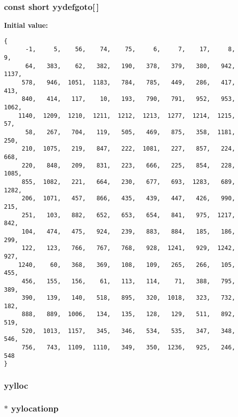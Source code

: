 \subsubsection{\setlength{\rightskip}{0pt plus 5cm}const short yydefgoto[$\,$]\hspace{0.3cm}{\tt  [static]}}\label{parser_8c_a222}


{\bf Initial value:}

\footnotesize\begin{verbatim}
{
      -1,     5,    56,    74,    75,     6,     7,    17,     8,     9,
      64,   383,    62,   382,   190,   378,   379,   380,   942,  1137,
     578,   946,  1051,  1183,   784,   785,   449,   286,   417,   413,
     840,   414,   117,    10,   193,   790,   791,   952,   953,  1062,
    1140,  1209,  1210,  1211,  1212,  1213,  1277,  1214,  1215,    57,
      58,   267,   704,   119,   505,   469,   875,   358,  1181,   250,
     210,  1075,   219,   847,   222,  1081,   227,   857,   224,   668,
     220,   848,   209,   831,   223,   666,   225,   854,   228,  1085,
     855,  1082,   221,   664,   230,   677,   693,  1283,   689,  1282,
     206,  1071,   457,   866,   435,   439,   447,   426,   990,   215,
     251,   103,   882,   652,   653,   654,   841,   975,  1217,   842,
     104,   474,   475,   924,   239,   883,   884,   185,   186,   299,
     122,   123,   766,   767,   768,   928,  1241,   929,  1242,   927,
    1240,    60,   368,   369,   108,   109,   265,   266,   105,   455,
     456,   155,   156,    61,   113,   114,    71,   388,   795,   389,
     390,   139,   140,   518,   895,   320,  1018,   323,   732,   182,
     888,   889,  1006,   134,   135,   128,   129,   511,   892,   519,
     520,  1013,  1157,   345,   346,   534,   535,   347,   348,   546,
     756,   743,  1109,  1110,   349,   350,  1236,   925,   246,   548
}\end{verbatim}\normalsize 
{}
\subsubsection{ yylloc}\label{parser_8c_a236}


\subsubsection{ $\ast$ yylocationp}\label{parser_8c_a232}


